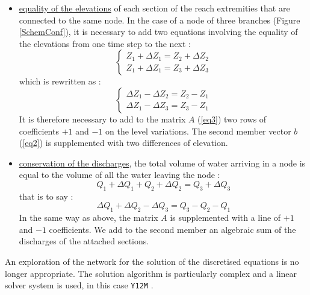 \begin{itemize}
 \item \underline{equality of the elevations} of each section of the reach extremities that are connected to the same node. In the case of a node of three branches (Figure \ref{SchemConf}), it is necessary to add two equations involving the equality of the elevations from one time step to the next :
  \begin{equation}
    \left \lbrace
     \begin{array}{l}
       Z_1 + \Delta Z_1 = Z_2 + \Delta Z_2 \\
       Z_1 + \Delta Z_1 = Z_3 + \Delta Z_3
     \end{array}
    \right.
  \end{equation}
	which is rewritten as :
  \begin{equation}
    \left \lbrace
     \begin{array}{l}
       \Delta Z_1 - \Delta Z_2 = Z_2 - Z_1\\
       \Delta Z_1 - \Delta Z_3 = Z_3 - Z_1
     \end{array}
    \right.
  \end{equation}
  It is therefore necessary to add to the matrix $A$ (\ref{eq3}) two rows of coefficients $+1$ and $-1$ on the level variations. The second member vector $b$ (\ref{eq2}) is supplemented with two differences of elevation.

  \item \underline{conservation of the discharges}, the total volume of water arriving in a node is equal to the volume of all the water leaving the node :
   \begin{equation}
     Q_1 + \Delta Q_1 + Q_2 + \Delta Q_2 = Q_3 + \Delta Q_3
   \end{equation}
   that is to say :
   \begin{equation}
     \Delta Q_1 + \Delta Q_2 - \Delta Q_3 = Q_3 -Q_2 - Q_1
   \end{equation}
   In the same way as above, the matrix $A$ is supplemented with a line of $+1$ and $-1$ coefficients.  We add to the second member an algebraic sum of the discharges of the attached sections.
\end{itemize}

An exploration of the network for the solution of the discretised equations is no longer appropriate. The solution algorithm is particularly complex and a linear solver system is used, in this case \texttt{Y12M} \cite{ZLATEV81}.

